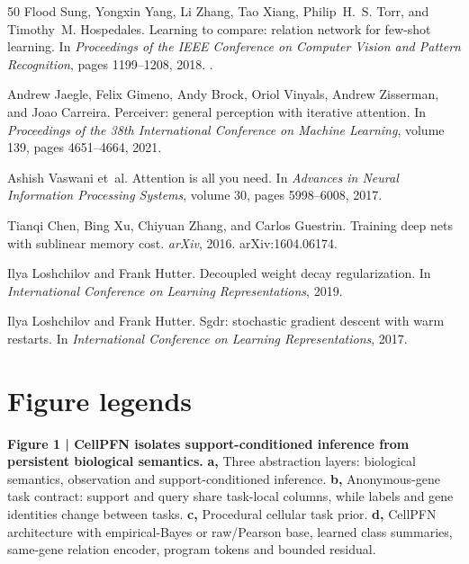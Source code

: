 \documentclass[12pt]{article}
\begin{document}
\begin{thebibliography}{50}
Flood Sung, Yongxin Yang, Li Zhang, Tao Xiang, Philip~H.~S. Torr, and Timothy~M. Hospedales.
\newblock Learning to compare: relation network for few-shot learning.
\newblock In \emph{Proceedings of the IEEE Conference on Computer Vision and Pattern Recognition}, pages 1199--1208, 2018.
\newblock {}.

Andrew Jaegle, Felix Gimeno, Andy Brock, Oriol Vinyals, Andrew Zisserman, and Joao Carreira.
\newblock Perceiver: general perception with iterative attention.
\newblock In \emph{Proceedings of the 38th International Conference on Machine Learning}, volume 139, pages 4651--4664, 2021.

Ashish Vaswani et~al.
\newblock Attention is all you need.
\newblock In \emph{Advances in Neural Information Processing Systems}, volume 30, pages 5998--6008, 2017.

Tianqi Chen, Bing Xu, Chiyuan Zhang, and Carlos Guestrin.
\newblock Training deep nets with sublinear memory cost.
\newblock \emph{arXiv}, 2016.
\newblock arXiv:1604.06174.

Ilya Loshchilov and Frank Hutter.
\newblock Decoupled weight decay regularization.
\newblock In \emph{International Conference on Learning Representations}, 2019.

Ilya Loshchilov and Frank Hutter.
\newblock Sgdr: stochastic gradient descent with warm restarts.
\newblock In \emph{International Conference on Learning Representations}, 2017.

\end{thebibliography}

\clearpage
\section*{Figure legends}

\textbf{Figure 1 | CellPFN isolates support-conditioned inference from persistent biological semantics.}
\textbf{a,} Three abstraction layers: biological semantics, observation and support-conditioned inference. \textbf{b,} Anonymous-gene task contract: support and query share task-local columns, while labels and gene identities change between tasks. \textbf{c,} Procedural cellular task prior. \textbf{d,} CellPFN architecture with empirical-Bayes or raw/Pearson base, learned class summaries, same-gene relation encoder, program tokens and bounded residual.
\end{document}
